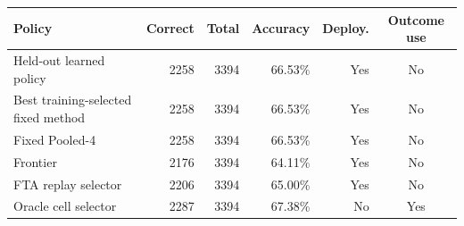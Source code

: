 \begin{tabularx}{\textwidth}{@{}Yrrrrc@{}}
\toprule
Policy & Correct & Total & Accuracy & Deploy. & Outcome use \\
\midrule
Held-out learned policy & 2258 & 3394 & 66.53\% & Yes & No \\
Best training-selected fixed method & 2258 & 3394 & 66.53\% & Yes & No \\
Fixed Pooled-4 & 2258 & 3394 & 66.53\% & Yes & No \\
Frontier & 2176 & 3394 & 64.11\% & Yes & No \\
FTA replay selector & 2206 & 3394 & 65.00\% & Yes & No \\
Oracle cell selector & 2287 & 3394 & 67.38\% & No & Yes \\
\bottomrule
\end{tabularx}
